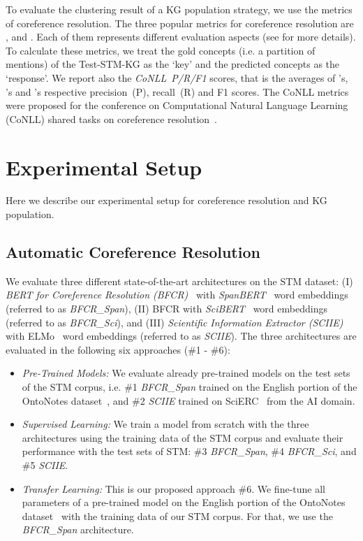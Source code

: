 \documentclass[runningheads]{llncs}
\begin{document}
To evaluate the clustering result of a KG population strategy, we use the metrics of coreference resolution.
The three popular metrics for coreference resolution are  \cite{VilainBACH95MUC},  \cite{Bagga98B3} and  \cite{Luo05CEAF}. Each of them represents different evaluation aspects (see \cite{Pradhan2014Scoring} for more details). 
To calculate these metrics, we treat the gold concepts (i.e. a partition of mentions) of the Test-STM-KG as the `key' and the predicted concepts as the `response'.
We report also the \emph{CoNLL~P/R/F1} scores, that is the averages of 's, 's and 's respective precision~(P), recall~(R) and F1 scores. The CoNLL metrics were proposed for the conference on Computational Natural Language Learning (CoNLL) shared tasks on coreference resolution~\cite{Pradhan2014Scoring}.




\section{Experimental Setup}
Here we describe our experimental setup for coreference resolution and KG population.

\subsection{Automatic Coreference Resolution}

We evaluate three different state-of-the-art architectures on the STM dataset:
(I) \emph{BERT for Coreference Resolution (BFCR)}~\cite{Joshi2020BFCR} with \emph{SpanBERT}~\cite{Joshi2020SpanBERT} word embeddings (referred to as \emph{BFCR\_Span}), (II) BFCR with \emph{SciBERT}~\cite{Beltagy2019SciBERTPC} word embeddings (referred to as \emph{BFCR\_Sci}), and (III) \emph{Scientific Information Extractor (SCIIE)}~\cite{Luan2018MultiTaskIO} with ELMo~\cite{Peters2018ELMo} word embeddings (referred to as \emph{SCIIE}).
The three architectures are evaluated in the following six approaches (\#1 - \#6):
\begin{itemize}[nosep] 
    \item \emph{Pre-Trained Models:}
We evaluate already pre-trained models on the test sets of the STM corpus, i.e.
\#1 \emph{BFCR\_Span} trained on the English portion of the OntoNotes dataset~\cite{PradhanCoNLL2012}, and \#2 \emph{SCIIE} trained on SciERC~\cite{Luan2018MultiTaskIO} from the AI domain.    

    \item \emph{Supervised Learning:} 
We train a model from scratch with the three architectures using the training data of the STM corpus and evaluate their performance with the test sets of STM:
\#3 \emph{BFCR\_Span}, \#4 \emph{BFCR\_Sci}, and \#5  \emph{SCIIE}.    

    \item \emph{Transfer Learning:} 
This is our proposed approach \#6.
We fine-tune all parameters of a pre-trained model on the English portion of the OntoNotes dataset~\cite{Joshi2020SpanBERT} with the training data of our STM corpus.
For that, we use the \emph{BFCR\_Span} architecture.    
\end{itemize}
\end{document}
